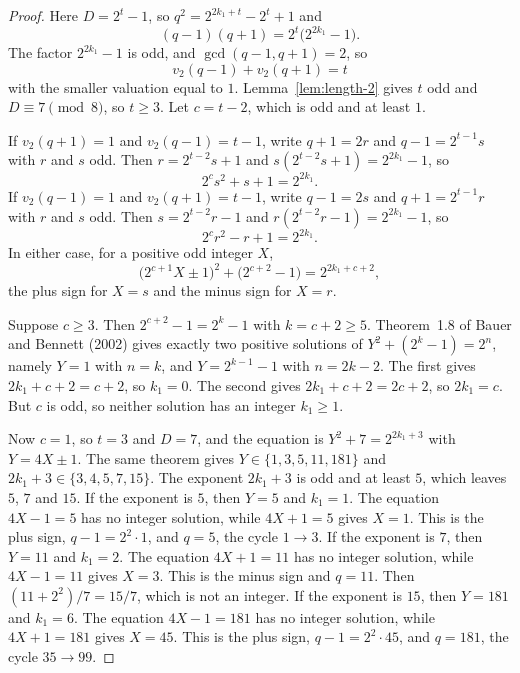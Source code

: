 \documentclass[11pt]{article}
\begin{document}
\begin{proof}
Here $D = 2^t - 1$, so $q^2 = 2^{2k_1 + t} - 2^t + 1$ and
\[
(q - 1)(q + 1) = 2^t\bigl(2^{2k_1} - 1\bigr).
\]
The factor $2^{2k_1} - 1$ is odd, and $\gcd(q - 1, q + 1) = 2$, so
\[
v_2(q - 1) + v_2(q + 1) = t
\]
with the smaller valuation equal to $1$.
Lemma~\ref{lem:length-2} gives $t$ odd and $D \equiv 7 \pmod{8}$, so $t \ge 3$.
Let $c = t - 2$, which is odd and at least $1$.

If $v_2(q + 1) = 1$ and $v_2(q - 1) = t - 1$, write $q + 1 = 2r$ and $q - 1 = 2^{t - 1} s$ with $r$ and $s$ odd.
Then $r = 2^{t - 2} s + 1$ and $s(2^{t - 2} s + 1) = 2^{2k_1} - 1$, so
\[
2^c s^2 + s + 1 = 2^{2k_1}.
\]
If $v_2(q - 1) = 1$ and $v_2(q + 1) = t - 1$, write $q - 1 = 2s$ and $q + 1 = 2^{t - 1} r$ with $r$ and $s$ odd.
Then $s = 2^{t - 2} r - 1$ and $r(2^{t - 2} r - 1) = 2^{2k_1} - 1$, so
\[
2^c r^2 - r + 1 = 2^{2k_1}.
\]
In either case, for a positive odd integer $X$,
\[
\bigl(2^{c + 1} X \pm 1\bigr)^2 + \bigl(2^{c + 2} - 1\bigr) = 2^{2k_1 + c + 2},
\]
the plus sign for $X = s$ and the minus sign for $X = r$.

Suppose $c \ge 3$.
Then $2^{c + 2} - 1 = 2^k - 1$ with $k = c + 2 \ge 5$.
Theorem~1.8 of Bauer and Bennett (2002) gives exactly two positive solutions of $Y^2 + (2^k - 1) = 2^n$, namely $Y = 1$ with $n = k$, and $Y = 2^{k - 1} - 1$ with $n = 2k - 2$.
The first gives $2k_1 + c + 2 = c + 2$, so $k_1 = 0$.
The second gives $2k_1 + c + 2 = 2c + 2$, so $2k_1 = c$.
But $c$ is odd, so neither solution has an integer $k_1 \ge 1$.

Now $c = 1$, so $t = 3$ and $D = 7$, and the equation is $Y^2 + 7 = 2^{2k_1 + 3}$ with $Y = 4X \pm 1$.
The same theorem gives $Y \in \{1, 3, 5, 11, 181\}$ and $2k_1 + 3 \in \{3, 4, 5, 7, 15\}$.
The exponent $2k_1 + 3$ is odd and at least $5$, which leaves $5$, $7$ and $15$.
If the exponent is $5$, then $Y = 5$ and $k_1 = 1$.
The equation $4X - 1 = 5$ has no integer solution, while $4X + 1 = 5$ gives $X = 1$.
This is the plus sign, $q - 1 = 2^{2} \cdot 1$, and $q = 5$, the cycle $1 \to 3$.
If the exponent is $7$, then $Y = 11$ and $k_1 = 2$.
The equation $4X + 1 = 11$ has no integer solution, while $4X - 1 = 11$ gives $X = 3$.
This is the minus sign and $q = 11$.
Then $(11 + 2^2)/7 = 15/7$, which is not an integer.
If the exponent is $15$, then $Y = 181$ and $k_1 = 6$.
The equation $4X - 1 = 181$ has no integer solution, while $4X + 1 = 181$ gives $X = 45$.
This is the plus sign, $q - 1 = 2^{2} \cdot 45$, and $q = 181$, the cycle $35 \to 99$.
\end{proof}
\end{document}
